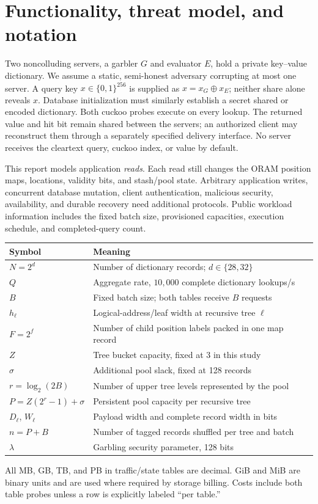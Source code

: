 \documentclass[11pt]{article}
\newcommand{\xor}{\mathbin{\oplus}}
\begin{document}
\clearpage
{\small\setlength{\parskip}{0pt}\tableofcontents}
\clearpage

\section{Functionality, threat model, and notation}
\label{sec:scope}
Two noncolluding servers, a garbler $G$ and evaluator $E$, hold a private
key--value dictionary. We assume a static, semi-honest adversary corrupting
at most one server. A query key $x\in\{0,1\}^{256}$ is supplied as
$x=x_G\xor x_E$; neither share alone reveals $x$. Database initialization
must similarly establish a secret shared or encoded dictionary. Both
cuckoo probes execute on every lookup. The returned value and hit bit remain
shared between the servers; an authorized client may reconstruct them through
a separately specified delivery interface. No server receives the cleartext
query, cuckoo index, or value by default.

This report models application \emph{reads}. Each read still changes the ORAM
position maps, locations, validity bits, and stash/pool state. Arbitrary
application writes, concurrent database mutation, client authentication,
malicious security, availability, and durable recovery need additional
protocols. Public workload information includes the fixed batch size,
provisioned capacities, execution schedule, and completed-query count.

\begin{center}\small
\begin{tabularx}{\linewidth}{lX}\toprule
Symbol & Meaning\\\midrule
$N=2^d$ & Number of dictionary records; $d\in\{28,32\}$\\
$Q$ & Aggregate rate, $10{,}000$ complete dictionary lookups/s\\
$B$ & Fixed batch size; both tables receive $B$ requests\\
$h_\ell$ & Logical-address/leaf width at recursive tree $\ell$\\
$F=2^f$ & Number of child position labels packed in one map record\\
$Z$ & Tree bucket capacity, fixed at 3 in this study\\
$\sigma$ & Additional pool slack, fixed at 128 records\\
$r=\log_2(2B)$ & Number of upper tree levels represented by the pool\\
$P=Z(2^r-1)+\sigma$ & Persistent pool capacity per recursive tree\\
$D_\ell$, $W_\ell$ & Payload width and complete record width in bits\\
$n=P+B$ & Number of tagged records shuffled per tree and batch\\
$\lambda$ & Garbling security parameter, 128 bits\\
\bottomrule\end{tabularx}
\end{center}
All MB, GB, TB, and PB in traffic/state tables are decimal. GiB and MiB are
binary units and are used where required by storage billing. Costs include
both table probes unless a row is explicitly labeled ``per table.''
\end{document}
